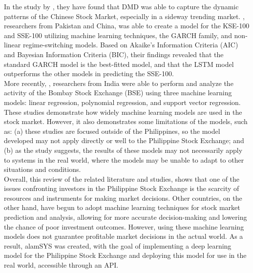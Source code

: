 In the study by , they have found that DMD was able to capture the 
dynamic patterns of the Chinese Stock Market, especially in a sideway trending market.
, researchers from Pakistan and China, was able to 
create a model for the KSE-100 and SSE-100 utilizing machine learning techniques, the GARCH 
family, and non-linear regime-switching models. Based on Akaike's Information Criteria (AIC) 
and Bayesian Information Criteria (BIC), their findings revealed that the standard GARCH model 
is the best-fitted model, and that the LSTM model outperforms the other models in predicting 
the SSE-100.
\\

More recently, , researchers from India were able 
to perform and analyze the activity of the Bombay Stock Exchange (BSE) using three machine learning models: 
linear regression, polynomial regression, and support vector regression.
\\

These studies demonstrate how widely machine learning models are used in the stock market. 
However, it also demonstrates some limitations of the models, such as: (a) these studies 
are focused outside of the Philippines, so the model developed may not apply directly or 
well to the Philippine Stock Exchange; and (b) as the  study suggests, the results 
of these models may not necessarily apply to systems in the real world, where the models 
may be unable to adapt to other situations and conditions.
\\


Overall, this review of the related literature and studies, shows that one of the issues 
confronting investors in the Philippine Stock Exchange is the scarcity of resources and 
instruments for making market decisions. Other countries, on the other hand, have begun to 
adopt machine learning techniques for stock market prediction and analysis, allowing for 
more accurate decision-making and lowering the chance of poor investment outcomes. 
However, using these machine learning models does not guarantee profitable market decisions in 
the actual world. As a result, alamSYS was created, with the goal of implementing a deep 
learning model for the Philippine Stock Exchange and deploying this model for use in the 
real world, accessible through an API.
\\
